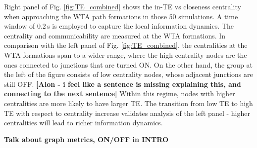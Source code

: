 \documentclass[fleqn,10pt,  reprint, amsmath,amssymb,aps, floatfix]{wlscirep}
\begin{document}
Right panel of Fig. \ref{fig:TE_combined} shows the in-TE vs closeness centrality when approaching the WTA path formations in those 50 simulations. A time window of $0.2 \,$s is employed to capture the local information dynamics. The centrality and communicability are measured at the WTA formations. In comparison with the left panel of Fig. \ref{fig:TE_combined}, the centralities at the WTA formations span to a wider range, where the high centrality nodes are the ones connected to junctions that are turned ON. On the other hand, the group at the left of the figure consists of low centrality nodes, whose adjacent junctions are still OFF. \textbf{[Alon - i feel like a sentence is missing explaining this, and connecting to the next sentence]} Within this regime, nodes with higher centralities are more likely to have larger TE. The transition from low TE to high TE with respect to centrality increase validates analysis of the left panel - higher centralities will lead to richer information dynamics.

\textbf{Talk about graph metrics, ON/OFF in INTRO}

\end{document}
